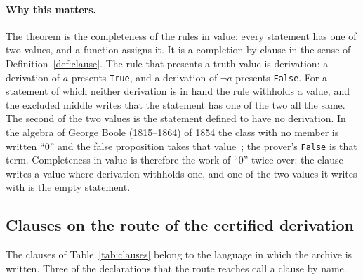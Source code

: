 \documentclass[11pt]{article}
\theoremstyle{definition}
\theoremstyle{remark}
\DeclareRobustCommand{\lean}[1]{{\renewcommand{\_}{\textunderscore\allowbreak}\texttt{#1}}}
\newcommand{\True}{\lean{True}}
\newcommand{\False}{\lean{False}}
\begin{document}
\paragraph{Why this matters.} The theorem is the completeness of the rules in value: every statement has one of two values, and a function assigns it. It is a completion by clause in the sense of Definition~\ref{def:clause}. The rule that presents a truth value is derivation: a derivation of $a$ presents \True, and a derivation of $\neg a$ presents \False. For a statement of which neither derivation is in hand the rule withholds a value, and the excluded middle writes that the statement has one of the two all the same. The second of the two values is the statement defined to have no derivation. In the algebra of George Boole (1815--1864) of 1854 the class with no member is written ``0'' and the false proposition takes that value~\citep{boole54}; the prover's \False{} is that term. Completeness in value is therefore the work of ``0'' twice over: the clause writes a value where derivation withholds one, and one of the two values it writes with is the empty statement.

\subsection{Clauses on the route of the certified derivation}

The clauses of Table~\ref{tab:clauses} belong to the language in which the archive is written. Three of the declarations that the route reaches call a clause by name.
\end{document}
